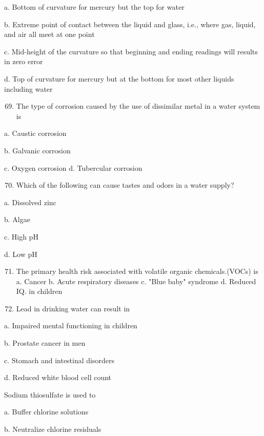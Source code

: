 \documentclass[10pt]{article}
\begin{document}
a. Bottom of curvature for mercury but the top for water

b. Extreme point of contact between the liquid and glass, i.e., where gas, liquid, and air all meet at one point

c. Mid-height of the curvature so that beginning and ending readings will results in zero error

d. Top of curvature for mercury but at the bottom for most other liquids including water

\begin{enumerate}
  \setcounter{enumi}{68}
  \item The type of corrosion caused by the use of dissimilar metal in a water system is
\end{enumerate}

a. Caustic corrosion

b. Galvanic corrosion

c. Oxygen corrosion d. Tubercular corrosion

\begin{enumerate}
  \setcounter{enumi}{69}
  \item Which of the following can cause tastes and odors in a water supply?
\end{enumerate}

a. Dissolved zinc

b. Algae

c. High $\mathrm{pH}$

d. Low $\mathrm{pH}$

\begin{enumerate}
  \setcounter{enumi}{70}
  \item The primary health risk associated with volatile organic chemicals.(VOCs) is
a. Cancer
b. Acute respiratory diseases
c. "Blue baby" syndrome
d. Reduced IQ. in children

  \item Lead in drinking water can result in

\end{enumerate}

a. Impaired mental functioning in children

b. Prostate cancer in men

c. Stomach and intestinal disorders

d. Reduced white blood cell count

Sodium thiosulfate is used to

a. Buffer chlorine solutions

b. Neutralize chlorine residuals
\end{document}

